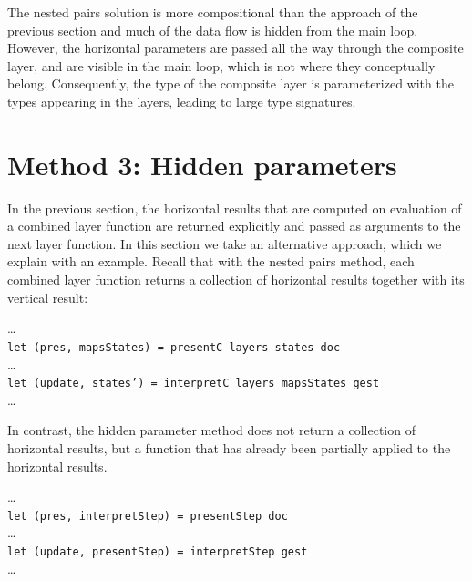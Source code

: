 \documentclass[preprint,natbib]{sigplanconf}
\begin{document}

The nested pairs solution is more compositional than the approach of the previous section and much of the data flow is hidden from the main loop. However, the horizontal parameters are passed all the way through the composite layer, and are visible in the main loop, which is not where they conceptually belong. Consequently, the type of the composite layer is parameterized with the types appearing in the layers, leading to large type signatures.



%																
%																
%																
\section{Method 3: Hidden parameters} \label{sect:hidden}

 
In the previous section, the horizontal results that are computed on evaluation of a combined layer function are returned explicitly and passed as arguments to the next layer function. In this section we take an alternative approach, which we explain with an example.  Recall that with the nested pairs method, each combined layer function returns a collection of horizontal results together with its vertical result:

\dots\\
{\tt  let (pres, mapsStates) = presentC layers states doc }\\
\dots\\
{\tt let (update, states') = interpretC layers mapsStates gest}\\
\dots

In contrast, the hidden parameter method does not return a collection of horizontal results, but a function that has already been partially applied to the horizontal results.

\dots\\
{\tt let (pres, interpretStep) = presentStep doc}\\
\dots\\
{\tt let (update, presentStep) = interpretStep gest}\\
\dots
\end{document}
